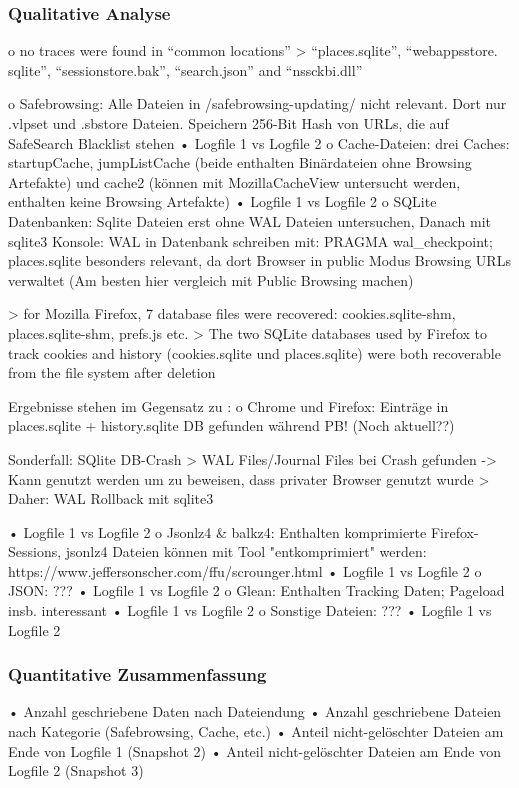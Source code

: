 \subsubsection*{Qualitative Analyse}

o no traces were found in “common locations” \cite{Montasari.2015}
	>  “places.sqlite”, “webappsstore. sqlite”, “sessionstore.bak”, “search.json” and “nssckbi.dll”


o	Safebrowsing: Alle Dateien in /safebrowsing-updating/ nicht relevant. Dort nur .vlpset und .sbstore Dateien. Speichern 256-Bit Hash von URLs, die auf SafeSearch Blacklist stehen 
	•	Logfile 1 vs Logfile 2
o	Cache-Dateien: drei Caches: startupCache, jumpListCache (beide enthalten Binärdateien ohne Browsing Artefakte) und cache2 (können mit MozillaCacheView untersucht werden, enthalten keine Browsing Artefakte)
	•	Logfile 1 vs Logfile 2
o	SQLite Datenbanken: Sqlite Dateien erst ohne WAL Dateien untersuchen, Danach mit sqlite3 Konsole: WAL in Datenbank schreiben mit: PRAGMA wal\_checkpoint; places.sqlite besonders relevant, da dort Browser in public Modus Browsing URLs verwaltet (Am besten hier vergleich mit Public Browsing machen)
	
	> \cite{Fayyad.2021} for Mozilla Firefox, 7 database files were recovered: cookies.sqlite-shm, places.sqlite-shm, prefs.js etc.
	> \cite{Muir.2019} The two SQLite databases used by Firefox to track cookies and history (cookies.sqlite und places.sqlite) were both recoverable from the file system after deletion
	
	Ergebnisse stehen im Gegensatz zu \cite{Hedberg.2013} :
		o	Chrome und Firefox: Einträge in places.sqlite + history.sqlite DB gefunden während PB! (Noch aktuell??)

	Sonderfall: SQlite DB-Crash \cite{Hedberg.2013}
		> WAL Files/Journal Files bei Crash gefunden -> Kann genutzt werden um zu beweisen, dass privater Browser genutzt wurde
		> Daher: WAL Rollback mit sqlite3
		

	•	Logfile 1 vs Logfile 2
o	Jsonlz4 \& balkz4: Enthalten komprimierte Firefox-Sessions, jsonlz4 Dateien können mit Tool "entkomprimiert" werden: https://www.jeffersonscher.com/ffu/scrounger.html
	•	Logfile 1 vs Logfile 2
o	JSON: ???
	•	Logfile 1 vs Logfile 2
o	Glean: Enthalten Tracking Daten; Pageload insb. interessant
	•	Logfile 1 vs Logfile 2
o	Sonstige Dateien: ???
	•	Logfile 1 vs Logfile 2

\subsubsection*{Quantitative Zusammenfassung}
•	Anzahl geschriebene Daten nach Dateiendung
•	Anzahl geschriebene Dateien nach Kategorie (Safebrowsing, Cache, etc.)
•	Anteil nicht-gelöschter Dateien am Ende von Logfile 1 (Snapshot 2)
•	Anteil nicht-gelöschter Dateien am Ende von Logfile 2 (Snapshot 3)


